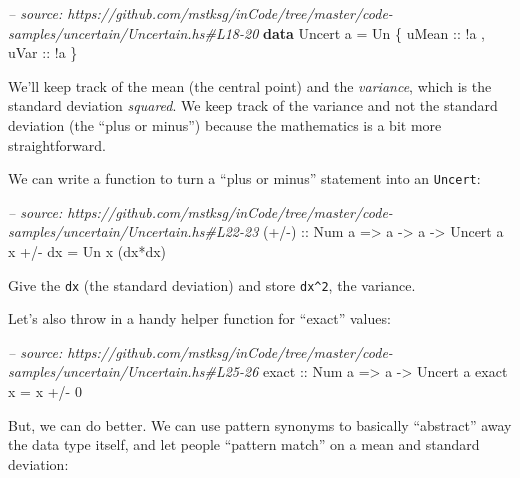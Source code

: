 \documentclass[]{article}
\newenvironment{Shaded}{}{}
\newcommand{\KeywordTok}[1]{\textcolor[rgb]{0.00,0.44,0.13}{\textbf{{#1}}}}
\newcommand{\DataTypeTok}[1]{\textcolor[rgb]{0.56,0.13,0.00}{{#1}}}
\newcommand{\DecValTok}[1]{\textcolor[rgb]{0.25,0.63,0.44}{{#1}}}
\newcommand{\CommentTok}[1]{\textcolor[rgb]{0.38,0.63,0.69}{\textit{{#1}}}}
\newcommand{\OtherTok}[1]{\textcolor[rgb]{0.00,0.44,0.13}{{#1}}}
\newcommand{\FunctionTok}[1]{\textcolor[rgb]{0.02,0.16,0.49}{{#1}}}
\newcommand{\NormalTok}[1]{{#1}}
\begin{document}
\begin{Shaded}
\begin{Highlighting}[]
\CommentTok{-- source: https://github.com/mstksg/inCode/tree/master/code-samples/uncertain/Uncertain.hs#L18-20}
\KeywordTok{data} \DataTypeTok{Uncert} \NormalTok{a }\FunctionTok{=} \DataTypeTok{Un} \NormalTok{\{}\OtherTok{ uMean ::} \FunctionTok{!}\NormalTok{a}
                   \NormalTok{,}\OtherTok{ uVar  ::} \FunctionTok{!}\NormalTok{a}
                   \NormalTok{\}}
\end{Highlighting}
\end{Shaded}

We'll keep track of the mean (the central point) and the
\emph{variance}, which is the standard deviation \emph{squared}. We keep
track of the variance and not the standard deviation (the ``plus or
minus'') because the mathematics is a bit more straightforward.

We can write a function to turn a ``plus or minus'' statement into an
\texttt{Uncert}:

\begin{Shaded}
\begin{Highlighting}[]
\CommentTok{-- source: https://github.com/mstksg/inCode/tree/master/code-samples/uncertain/Uncertain.hs#L22-23}
\OtherTok{(+/-) ::} \DataTypeTok{Num} \NormalTok{a }\OtherTok{=>} \NormalTok{a }\OtherTok{->} \NormalTok{a }\OtherTok{->} \DataTypeTok{Uncert} \NormalTok{a}
\NormalTok{x }\FunctionTok{+/-} \NormalTok{dx }\FunctionTok{=} \DataTypeTok{Un} \NormalTok{x (dx}\FunctionTok{*}\NormalTok{dx)}
\end{Highlighting}
\end{Shaded}

Give the \texttt{dx} (the standard deviation) and store
\texttt{dx\^{}2}, the variance.

Let's also throw in a handy helper function for ``exact'' values:

\begin{Shaded}
\begin{Highlighting}[]
\CommentTok{-- source: https://github.com/mstksg/inCode/tree/master/code-samples/uncertain/Uncertain.hs#L25-26}
\OtherTok{exact ::} \DataTypeTok{Num} \NormalTok{a }\OtherTok{=>} \NormalTok{a }\OtherTok{->} \DataTypeTok{Uncert} \NormalTok{a}
\NormalTok{exact x }\FunctionTok{=} \NormalTok{x }\FunctionTok{+/-} \DecValTok{0}
\end{Highlighting}
\end{Shaded}

But, we can do better. We can use pattern synonyms to basically
``abstract'' away the data type itself, and let people ``pattern match''
on a mean and standard deviation:
\end{document}
